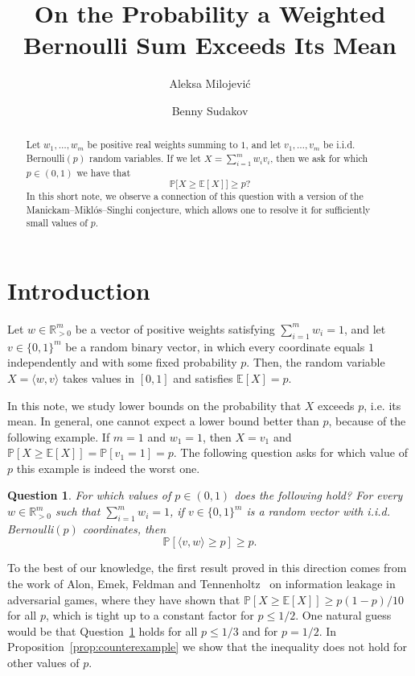 \documentclass[11pt]{amsart}
\title{\vspace{-0.9cm} On the Probability a Weighted Bernoulli Sum Exceeds Its Mean}
\date{}
\author{Aleksa Milojevi\'c}
\author{Benny Sudakov}
\newtheorem{question}[theorem]{\bf Question}
\theoremstyle{definition}
\def\bE{\mathbb{E}}
\def\bR{\mathbb{R}}
\def\Pb{\mathbb{P}}
\begin{document}
\maketitle

\begin{abstract}
Let $w_1, \dots, w_m$ be positive real weights summing to $1$, and let $v_1, \dots, v_m$ be i.i.d. Bernoulli$(p)$ random variables. If we let $X=\sum_{i=1}^m w_i v_i$, then we ask for which $p\in (0, 1)$ we have that
\[\Pb\big[X\geq \bE[X]\big]\geq p?\] 
In this short note, we observe a connection of this question with a version of the Manickam--Mikl\'os--Singhi conjecture, which allows one to resolve it for sufficiently small values of $p$.
\end{abstract}

\section{Introduction}

Let $w\in \bR_{>0}^m$ be a vector of positive weights satisfying $\sum_{i=1}^m w_i=1$, and let $v\in \{0, 1\}^m$ be a random binary vector, in which every coordinate equals $1$ independently and with some fixed probability $p$. Then, the random variable $X=\langle w, v\rangle$ takes
values in $[0,1]$ and satisfies $\bE[X]=p$. 

In this note, we study lower bounds on the probability that $X$ exceeds $p$, i.e. its mean. In general, one cannot expect a lower bound better than $p$, because of the following example. If $m=1$ and $w_1=1$, then $X=v_1$ and $\Pb[X\ge \bE[X]]=\Pb[v_1=1]=p$. The following question asks for which value of $p$ this example is indeed the worst one. 

\begin{question}\label{q:prob}
For which values of $p\in (0, 1)$ does the following hold? For every $w\in \bR_{>0}^m$ such that $\sum_{i=1}^m w_i=1$, if $v\in \{0, 1\}^m$ is a random vector with i.i.d. Bernoulli$(p)$ coordinates, then
\[\Pb[\langle v, w\rangle\geq p]\geq p.\]
\end{question}

To the best of our knowledge, the first result proved in this direction comes from the work of Alon, Emek, Feldman and Tennenholtz~\cite{AEFT13} on information leakage in adversarial games, where they have shown that $\Pb[X\ge \bE[X]]\ge p(1-p)/10$ for all $p$, which is tight up to a constant factor for $p\leq 1/2$. One natural guess would be that Question~\ref{q:prob} holds for all $p\leq 1/3$ and for $p=1/2$. In Proposition~\ref{prop:counterexample} we show that the inequality does not hold for other values of $p$.
\end{document}
